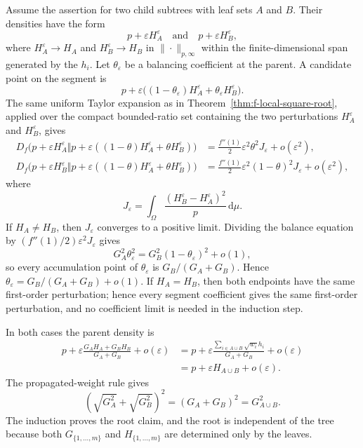 \documentclass[runningheads]{llncs}
\newcommand{\dd}{\,\mathrm{d}}
\begin{document}
Assume the assertion for two child subtrees with leaf sets $A$ and $B$. Their densities have the form
\begin{equation*}
  p+\varepsilon H_A^\varepsilon
  \quad\text{and}\quad
  p+\varepsilon H_B^\varepsilon,
\end{equation*}
where $H_A^\varepsilon\to H_A$ and $H_B^\varepsilon\to H_B$ in $\|\cdot\|_{p,\infty}$ within the finite-dimensional span generated by the $h_i$. Let $\theta_\varepsilon$ be a balancing coefficient at the parent. A candidate point on the segment is
\begin{equation*}
  p+\varepsilon\bigl((1-\theta_\varepsilon)H_A^\varepsilon+\theta_\varepsilon H_B^\varepsilon\bigr).
\end{equation*}
The same uniform Taylor expansion as in Theorem~\ref{thm:f-local-square-root}, applied over the compact bounded-ratio set containing the two perturbations $H_A^\varepsilon$ and $H_B^\varepsilon$, gives
\begin{align*}
D_f\bigl(p+\varepsilon H_A^\varepsilon\Vert
p+\varepsilon((1-\theta)H_A^\varepsilon+\theta H_B^\varepsilon)\bigr)
&=\frac{f''(1)}{2}\varepsilon^2\theta^2 J_\varepsilon+o(\varepsilon^2),\\
D_f\bigl(p+\varepsilon H_B^\varepsilon\Vert
p+\varepsilon((1-\theta)H_A^\varepsilon+\theta H_B^\varepsilon)\bigr)
&=\frac{f''(1)}{2}\varepsilon^2(1-\theta)^2 J_\varepsilon+o(\varepsilon^2),
\end{align*}
where
\begin{equation*}
  J_\varepsilon=\int_\Omega \frac{(H_B^\varepsilon-H_A^\varepsilon)^2}{p}\dd\mu.
\end{equation*}
If $H_A\neq H_B$, then $J_\varepsilon$ converges to a positive limit. Dividing the balance equation by $(f''(1)/2)\varepsilon^2J_\varepsilon$ gives
\begin{equation*}
  G_A^2\theta_\varepsilon^2=G_B^2(1-\theta_\varepsilon)^2+o(1),
\end{equation*}
so every accumulation point of $\theta_\varepsilon$ is $G_B/(G_A+G_B)$. Hence $\theta_\varepsilon=G_B/(G_A+G_B)+o(1)$. If $H_A=H_B$, then both endpoints have the same first-order perturbation; hence every segment coefficient gives the same first-order perturbation, and no coefficient limit is needed in the induction step.

In both cases the parent density is
\begin{align*}
  p+\varepsilon\frac{G_AH_A+G_BH_B}{G_A+G_B}+o(\varepsilon)
  &=p+\varepsilon\frac{\sum_{i\in A\cup B}\sqrt{w_i}h_i}{G_A+G_B}+o(\varepsilon)\\
  &=p+\varepsilon H_{A\cup B}+o(\varepsilon).
\end{align*}
The propagated-weight rule gives
\begin{equation*}
  (\sqrt{G_A^2}+\sqrt{G_B^2})^2=(G_A+G_B)^2=G_{A\cup B}^2.
\end{equation*}
The induction proves the root claim, and the root is independent of the tree because both $G_{\{1,\ldots,m\}}$ and $H_{\{1,\ldots,m\}}$ are determined only by the leaves.
\end{document}
